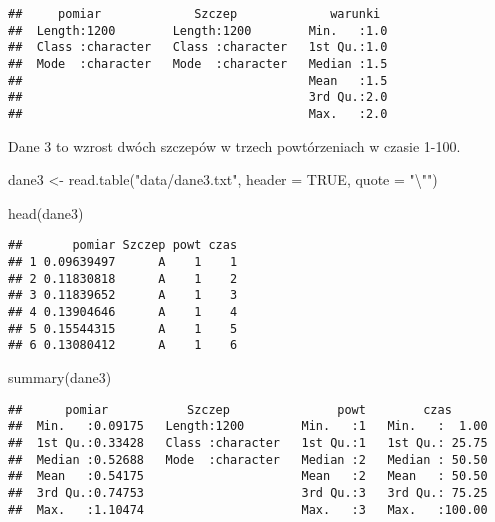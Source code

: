 \documentclass[
]{book}
\newenvironment{Shaded}{\begin{snugshade}}{\end{snugshade}}
\newcommand{\AttributeTok}[1]{\textcolor[rgb]{0.77,0.63,0.00}{#1}}
\newcommand{\ConstantTok}[1]{\textcolor[rgb]{0.00,0.00,0.00}{#1}}
\newcommand{\FunctionTok}[1]{\textcolor[rgb]{0.00,0.00,0.00}{#1}}
\newcommand{\NormalTok}[1]{#1}
\newcommand{\OtherTok}[1]{\textcolor[rgb]{0.56,0.35,0.01}{#1}}
\newcommand{\SpecialCharTok}[1]{\textcolor[rgb]{0.00,0.00,0.00}{#1}}
\newcommand{\StringTok}[1]{\textcolor[rgb]{0.31,0.60,0.02}{#1}}
\begin{document}
\begin{verbatim}
##     pomiar             Szczep             warunki   
##  Length:1200        Length:1200        Min.   :1.0  
##  Class :character   Class :character   1st Qu.:1.0  
##  Mode  :character   Mode  :character   Median :1.5  
##                                        Mean   :1.5  
##                                        3rd Qu.:2.0  
##                                        Max.   :2.0
\end{verbatim}

Dane 3 to wzrost dwóch szczepów w trzech powtórzeniach w czasie 1-100.

\begin{Shaded}
\begin{Highlighting}[]
\NormalTok{dane3 }\OtherTok{\textless{}{-}} \FunctionTok{read.table}\NormalTok{(}\StringTok{"data/dane3.txt"}\NormalTok{, }\AttributeTok{header =} \ConstantTok{TRUE}\NormalTok{, }\AttributeTok{quote =} \StringTok{"}\SpecialCharTok{\textbackslash{}"}\StringTok{"}\NormalTok{)}

\FunctionTok{head}\NormalTok{(dane3)}
\end{Highlighting}
\end{Shaded}

\begin{verbatim}
##       pomiar Szczep powt czas
## 1 0.09639497      A    1    1
## 2 0.11830818      A    1    2
## 3 0.11839652      A    1    3
## 4 0.13904646      A    1    4
## 5 0.15544315      A    1    5
## 6 0.13080412      A    1    6
\end{verbatim}

\begin{Shaded}
\begin{Highlighting}[]
\FunctionTok{summary}\NormalTok{(dane3)}
\end{Highlighting}
\end{Shaded}

\begin{verbatim}
##      pomiar           Szczep               powt        czas       
##  Min.   :0.09175   Length:1200        Min.   :1   Min.   :  1.00  
##  1st Qu.:0.33428   Class :character   1st Qu.:1   1st Qu.: 25.75  
##  Median :0.52688   Mode  :character   Median :2   Median : 50.50  
##  Mean   :0.54175                      Mean   :2   Mean   : 50.50  
##  3rd Qu.:0.74753                      3rd Qu.:3   3rd Qu.: 75.25  
##  Max.   :1.10474                      Max.   :3   Max.   :100.00
\end{verbatim}
\end{document}
